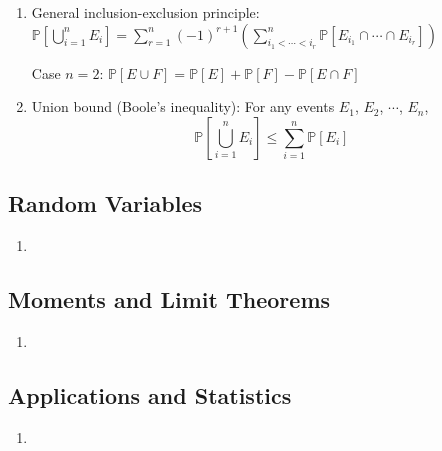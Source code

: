 \documentclass{article}
\begin{document}
\begin{enumerate}
	\item General inclusion-exclusion principle: $\displaystyle\mathbb{P}\left[\bigcup_{i=1}^n E_i\right]=\sum_{r=1}^{n}(-1)^{r+1}\left(\sum_{i_1<\cdots<i_r}^{n}\mathbb{P}[E_{i_1}\cap\cdots\cap E_{i_r}]\right)$ 
		
		Case $n=2$: $\mathbb{P}[E\cup F]=\mathbb{P}[E]+\mathbb{P}[F]-\mathbb{P}[E\cap F]$ \\
	
	\item Union bound (Boole's inequality): For any events $E_1$, $E_2$, $\cdots$, $E_n$,
		\vspace*{-0.5\baselineskip}$$\displaystyle\mathbb{P}\left[\bigcup_{i=1}^n E_i\right]\leq\sum_{i=1}^{n}\mathbb{P}[E_i]$$
	
\end{enumerate}

\subsection{Random Variables}

\begin{enumerate}
	\item 
\end{enumerate}

\subsection{Moments and Limit Theorems}

\begin{enumerate}
	\item 
\end{enumerate}

\subsection{Applications and Statistics}

\begin{enumerate}
	\item 
\end{enumerate}
\end{document}
